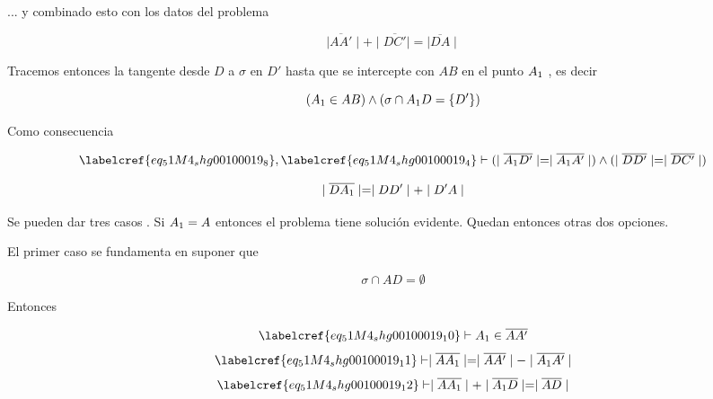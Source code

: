 ... y combinado esto con los datos del problema

\begin{equation} \label{eq_51M4_shg00100019_7}
	\mid\overline{AA'}\mid + \mid\overline{DC'}\mid = \mid\overline{DA}\mid
\end{equation}

Tracemos entonces la tangente desde $D$ a $\sigma$ en $D'$ hasta que se intercepte con $AB$ en el punto $A\textsubscript{1}$ , es decir

\begin{equation} \label{eq_51M4_shg00100019_8}
	(A\textsubscript{1} \in AB) \land (\sigma \cap A\textsubscript{1}D = \{D'\})\\
\end{equation}

Como consecuencia 

\begin{equation} \label{eq_51M4_shg00100019_9}
\begin{gathered}
	 \labelcref{eq_51M4_shg00100019_8}, \labelcref{eq_51M4_shg00100019_4} \vdash (\mid\overline{A\textsubscript{1}D'}\mid = \mid\overline{A\textsubscript{1}A'}\mid) \land (\mid\overline{DD'}\mid = \mid\overline{DC'}\mid)
\end{gathered}
\end{equation}

\begin{equation} \label{eq_51M4_shg00100019_9a}
	\mid\overline{DA\textsubscript{1}}\mid = \mid DD'\mid + \mid D'A \mid
\end{equation}

Se pueden dar tres casos . Si $A\textsubscript{1} = A$ entonces el problema tiene solución evidente. Quedan entonces otras dos opciones.

El primer caso se fundamenta en suponer que

\begin{equation} \label{eq_51M4_shg00100019_10}
	\sigma \cap AD = \emptyset
\end{equation}

Entonces 

\begin{equation} \label{eq_51M4_shg00100019_11}
	\labelcref{eq_51M4_shg00100019_10} \vdash A\textsubscript{1} \in \overline{AA'}
\end{equation}
\begin{equation} \label{eq_51M4_shg00100019_12}
	\labelcref{eq_51M4_shg00100019_11} \vdash \mid\overline{AA\textsubscript{1}}\mid = \mid\overline{AA'}\mid - \mid\overline{A\textsubscript{1}A'}\mid
\end{equation}
\begin{equation} \label{eq_51M4_shg00100019_13}
	\labelcref{eq_51M4_shg00100019_12} \vdash \mid\overline{AA\textsubscript{1}}\mid + \mid\overline{A\textsubscript{1}D}\mid = \mid\overline{AD}\mid
\end{equation}


